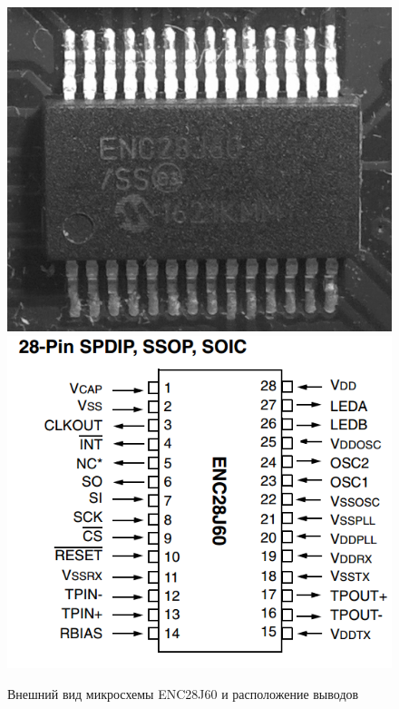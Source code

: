 \begin{figure}[h!]
	\centering
		\includegraphics[scale=0.09]{img/enc28j60.png}
		\includegraphics[scale=0.36]{img/enc28j60io.png}
	\caption{Внешний вид микросхемы ENC28J60 и расположение выводов\label{fig:enc28j60}}
\end{figure}


